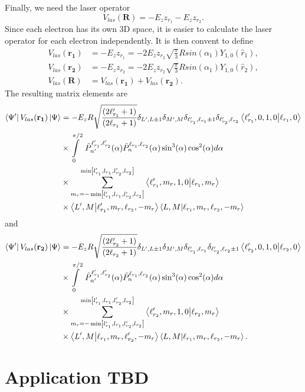 Finally, we need the laser operator
\begin{equation}
     V_{las}(\mathbf{R}) = - E_z z_{r_1} - E_z z_{r_2}.
\end{equation} 
Since each electron has its own 3D space, it is easier to calculate the laser operator for each electron independently. It is then convent to define 
\begin{align}
    V_{las}(\mathbf{r_1}) &= - E_z z_{r_1} = -2 E_z z_{r_2} \sqrt{\frac{\pi}{3}}Rsin(\alpha_1)Y_{1,0}(\hat{r}_1),\\
    V_{las}(\mathbf{r_2}) &= - E_z z_{r_2} = -2 E_z z_{r_2} \sqrt{\frac{\pi}{3}}Rsin(\alpha_1)Y_{1,0}(\hat{r}_2),\\
    V_{las}(\mathbf{R}) &= V_{las}(\mathbf{r_1})+V_{las}(\mathbf{r_2}).
\end{align}
The resulting matrix elements are
\begin{align}
    \bra{\Psi'}V_{las}(\mathbf{r_1})\ket{\Psi} &= - E_z R\sqrt{\frac{(2\ell_{r_1}'+1)}{(2\ell_{r_1}+1)}}\delta_{L',L\pm1}\delta_{M',M}\delta_{\ell_{r_1}',\ell_{r_1}\pm1}\delta_{\ell_{r_2}',\ell_{r_2}}\bra{\ell_{r_1}',0,1,0}\ket{\ell_{r_1},0} \\
    & \times \int\limits_0^{\pi/2}\ \tilde{P}^{\ell_{r_1}',\ell_{r_2}'}_{n'}(\alpha) \tilde{P}^{\ell_{r_1},\ell_{r_2}}_{n}(\alpha) \sin^3(\alpha) \cos^2(\alpha)d\alpha\\
    &\times \sum_{m_{r}=-\min
    \left[l_{r_1}',l_{r_1},l_{r_2}',l_{r_2}\right]}^{\min
    \left[l_{r_1}',l_{r_1},l_{r_2}',l_{r_2}\right]} \bra{\ell_{r_1}',m_{r},1,0}\ket{\ell_{r_1},m_{r}} \\
    &\times\bra{L',M}\ket{\ell_{r_1}',m_{r},\ell_{r_2},-m_{r}}\bra{L,M}\ket{\ell_{r_1},m_{r},\ell_{r_2},-m_{r}}
\end{align}
and 
\begin{align}
    \bra{\Psi'}V_{las}(\mathbf{r_2})\ket{\Psi} &= - E_z R\sqrt{\frac{(2\ell_{r_2}'+1)}{(2\ell_{r_2}+1)}}\delta_{L',L\pm1}\delta_{M',M}\delta_{\ell_{r_1}',\ell_{r_1}}\delta_{\ell_{r_2}',\ell_{r_2}\pm1}\bra{\ell_{r_2}',0,1,0}\ket{\ell_{r_2},0} \\
    & \times \int\limits_0^{\pi/2}\ \tilde{P}^{\ell_{r_1}',\ell_{r_2}'}_{n'}(\alpha) \tilde{P}^{\ell_{r_1},\ell_{r_2}}_{n}(\alpha) \sin^3(\alpha) \cos^2(\alpha)d\alpha\\
    &\times \sum_{m_{r}=-\min
    \left[l_{r_1}',l_{r_1},l_{r_2}',l_{r_2}\right]}^{\min
    \left[l_{r_1}',l_{r_1},l_{r_2}',l_{r_2}\right]} \bra{\ell_{r_2}',m_{r},1,0}\ket{\ell_{r_2},m_{r}} \\
    &\times\bra{L',M}\ket{\ell_{r_1},m_{r},\ell_{r_2}',-m_{r}}\bra{L,M}\ket{\ell_{r_1},m_{r},\ell_{r_2},-m_{r}}.
\end{align}


\section{Application TBD} %
\label{sec:application_tbd}

